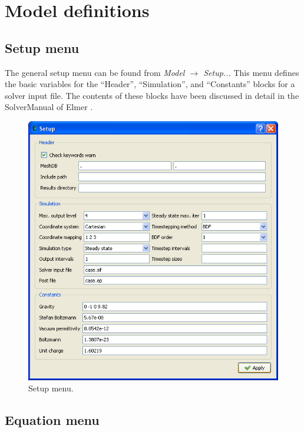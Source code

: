 \documentclass[a4paper,12pt]{article}
\newcommand{\menu}[2]{{\it \vskip2mm #1 $\rightarrow$ #2 \vskip2mm}}
\begin{document}
\section{Model definitions}

\subsection{Setup menu}

The general setup menu can be found from
\menu{Model}{Setup...}
\noindent This menu defines the basic variables for the ``Header'', ``Simulation'',
and ``Constants'' blocks for a solver input file. The contents of these blocks have
been discussed in detail in the SolverManual of Elmer \cite{ElmerHome}.

\begin{figure}[ht]
\begin{center}
 \includegraphics[scale=0.5]{images/setupmenu.png}
\caption{Setup menu.}
\end{center}
\end{figure}

\subsection{Equation menu}
\end{document}
